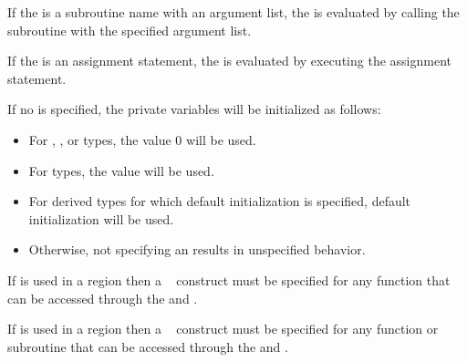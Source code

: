 \begin{fortranspecific}
If the  is a subroutine name with an argument list, 
the  is evaluated by calling the subroutine with the  
specified argument list.

If the  is an assignment statement, the 
 is evaluated by executing the assignment statement.

If no  is specified, the private variables will be 
initialized as follows:

\begin{itemize}
\item For , , or  types, the value 0 
      will be used.
\item For  types, the value  will be used.
\item For derived types for which default initialization is specified, default 
      initialization will be used.
\item Otherwise, not specifying an  results in unspecified 
      behavior.
\end{itemize}
\end{fortranspecific}

\begin{ccppspecific}
If  is used in a  region then a 
~ construct must be specified for any function 
that can be accessed through the  and
.
\end{ccppspecific}

\begin{fortranspecific}
If  is used in a  region then a 
~ construct must be specified for any function 
or subroutine that can be accessed through the  
and .
\end{fortranspecific}

